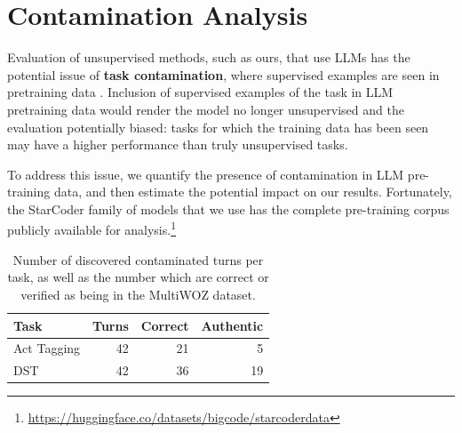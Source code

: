 \documentclass[11pt]{article}
\begin{document}
\section{Contamination Analysis}
\label{sec:contamination-analysis}

Evaluation of unsupervised methods, such as ours, that use LLMs has the potential issue of \textbf{task contamination}, where supervised examples are seen in pretraining data \cite{li_task_2024}.  Inclusion of supervised examples of the task in LLM pretraining data would render the model no longer unsupervised and the evaluation potentially biased: tasks for which the training data has been seen may have a higher performance than truly unsupervised tasks.

To address this issue, we quantify the presence of contamination in LLM pre-training data, and then estimate the potential impact on our results.
Fortunately, the StarCoder family of models that we use has the complete pre-training corpus publicly available for analysis.\footnote{\href{https://huggingface.co/datasets/bigcode/starcoderdata}{https://huggingface.co/datasets/bigcode/starcoderdata}}

\begin{table}[]
    \centering
    \begin{tabular}{l|r:rr}
         \textbf{Task} & \textbf{Turns} & \textbf{Correct} & \textbf{Authentic} \\
         \hline
         Act Tagging & 42 & 21 & 5 \\  
         DST & 42 & 36 & 19 \\  
    \end{tabular}
    \caption{Number of discovered contaminated turns per task, as well as the number which are correct or verified as being in the MultiWOZ dataset.}
    \label{tab:contamination}
\end{table}
\end{document}

